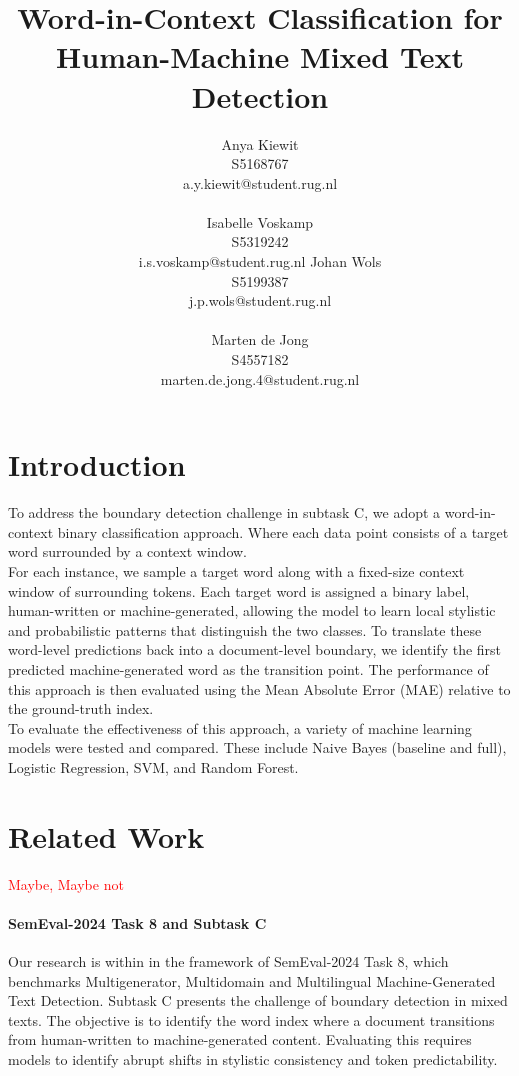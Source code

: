 \documentclass[11pt]{article}
\title{Word-in-Context Classification for Human-Machine Mixed Text Detection}
\author{
    Anya Kiewit \\ S5168767 \\ a.y.kiewit@student.rug.nl \\
    \\
    Isabelle Voskamp \\ S5319242 \\ i.s.voskamp@student.rug.nl
    \And
    Johan Wols \\ S5199387 \\ j.p.wols@student.rug.nl \\
    \\
    Marten de Jong \\ S4557182 \\  marten.de.jong.4@student.rug.nl
}
\begin{document}
\maketitle
\begin{abstract}

\end{abstract}

\section{Introduction}
To address the boundary detection challenge in subtask C, we adopt a word-in-context binary classification approach.
Where each data point consists of a target word surrounded by a context window. \\

For each instance, we sample a target word along with a fixed-size context window of surrounding tokens.
Each target word is assigned a binary label, human-written or machine-generated, allowing the model to learn local stylistic and probabilistic patterns that distinguish the two classes.
To translate these word-level predictions back into a document-level boundary, we identify the first predicted machine-generated word as the transition point.
The performance of this approach is then evaluated using the Mean Absolute Error (MAE) relative to the ground-truth index.\\

To evaluate the effectiveness of this approach, a variety of machine learning models were tested and compared.
These include Naive Bayes (baseline and full), Logistic Regression, SVM, and Random Forest.

\section{Related Work}

\textcolor{red}{Maybe, Maybe not}

\paragraph{SemEval-2024 Task 8 and Subtask C}
Our research is within in the framework of SemEval-2024 Task 8, which benchmarks Multigenerator, Multidomain and Multilingual Machine-Generated Text Detection.
Subtask C presents the challenge of boundary detection in mixed texts. The objective is to identify the word index where a document transitions from human-written to machine-generated content.
Evaluating this requires models to identify abrupt shifts in stylistic consistency and token predictability.
\end{document}
